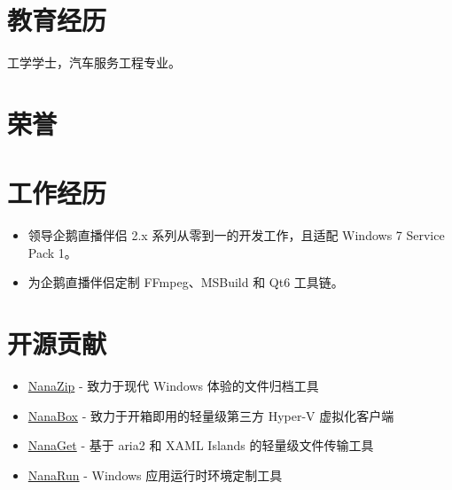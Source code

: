 \documentclass{resume}
\begin{document}
\renewcommand\headrulewidth{0pt}



\section{教育经历}

  工学学士，汽车服务工程专业。

\section{荣誉}


\section{工作经历}

\begin{itemize}
  \item 领导企鹅直播伴侣 2.x 系列从零到一的开发工作，且适配 Windows 7 Service Pack 1。
  \item 为企鹅直播伴侣定制 FFmpeg、MSBuild 和 Qt6 工具链。
\end{itemize}

\section{开源贡献}

\begin{itemize}
  \item \href{https://github.com/M2Team/NanaZip}{NanaZip} - 致力于现代 Windows 体验的文件归档工具
  \item \href{https://github.com/M2Team/NanaBox}{NanaBox} - 致力于开箱即用的轻量级第三方 Hyper-V 虚拟化客户端
  \item \href{https://github.com/M2Team/NanaGet}{NanaGet} - 基于 aria2 和 XAML Islands 的轻量级文件传输工具
  \item \href{https://github.com/M2Team/NanaRun}{NanaRun} - Windows 应用运行时环境定制工具
\end{itemize} 
\end{document}
